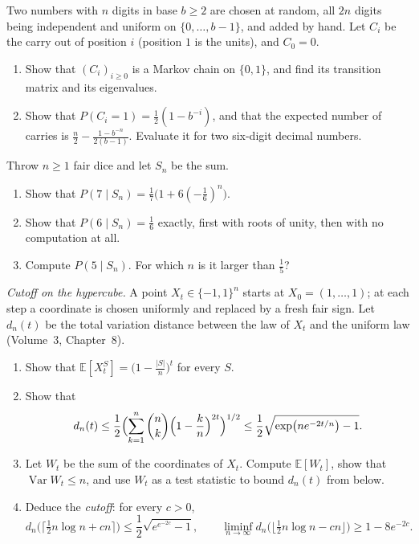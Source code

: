 \begin{exercise}[$\star\star$]\label{pb:carries}
Two numbers with $n$ digits in base $b\ge2$ are chosen at random, all $2n$ digits being independent and uniform on
$\{0,\dots,b-1\}$, and added by hand. Let $C_i$ be the carry out of position $i$ (position $1$ is the units), and $C_0=0$.
\begin{enumerate}[label=(\alph*)]
\item Show that $(C_i)_{i\ge0}$ is a Markov chain on $\{0,1\}$, and find its transition matrix and its eigenvalues.
\item Show that $P(C_i=1)=\frac12(1-b^{-i})$, and that the expected number of carries is
$\frac n2-\frac{1-b^{-n}}{2(b-1)}$. Evaluate it for two six-digit decimal numbers.
\end{enumerate}
\end{exercise}

\begin{exercise}[$\star$]\label{pb:dicemod}
Throw $n\ge1$ fair dice and let $S_n$ be the sum.
\begin{enumerate}[label=(\alph*)]
\item Show that $P(7\mid S_n)=\frac17\bigl(1+6(-\frac16)^n\bigr)$.
\item Show that $P(6\mid S_n)=\frac16$ exactly, first with roots of unity, then with no computation at all.
\item Compute $P(5\mid S_n)$. For which $n$ is it larger than $\frac15$?
\end{enumerate}
\end{exercise}

\begin{exercise}[Journey]\label{pb:hypercubemix}
\emph{Cutoff on the hypercube.} A point $X_t\in\{-1,1\}^n$ starts at $X_0=(1,\dots,1)$; at each step a coordinate is chosen uniformly
and replaced by a fresh fair sign. Let $d_n(t)$ be the total variation distance between the law of $X_t$ and the uniform law
(Volume~3, Chapter~8).
\begin{enumerate}[label=(\alph*)]
\item Show that $\mathbb E[X_t^S]=\bigl(1-\frac{|S|}n\bigr)^t$ for every $S$.
\item Show that
\[
d_n(t)\le\frac12\Bigl(\sum_{k=1}^n\binom nk\Bigl(1-\frac kn\Bigr)^{2t}\Bigr)^{1/2}\le\frac12\sqrt{\exp\bigl(ne^{-2t/n}\bigr)-1}.
\]
\item Let $W_t$ be the sum of the coordinates of $X_t$. Compute $\mathbb E[W_t]$, show that $\operatorname{Var}W_t\le n$, and use $W_t$ as a test statistic to
bound $d_n(t)$ from below.
\item Deduce the \emph{cutoff}: for every $c>0$,
\[
d_n\bigl(\bigl\lceil\tfrac12n\log n+cn\bigr\rceil\bigr)\le\frac12\sqrt{e^{e^{-2c}}-1},\qquad\liminf_{n\to\infty}d_n\bigl(\bigl\lfloor\tfrac12n\log n-cn\bigr\rfloor\bigr)\ge1-8e^{-2c}.
\]
\end{enumerate}
\end{exercise}

